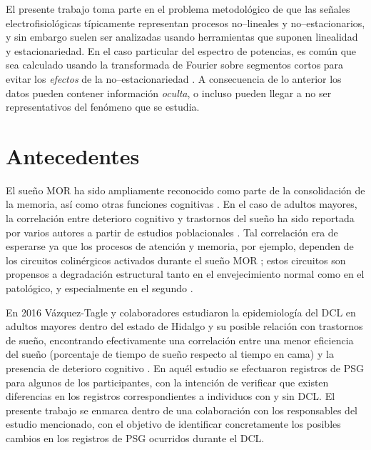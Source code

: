El presente trabajo toma parte en el problema metodológico de que las señales 
electrofisiológicas típicamente representan procesos no--lineales y no--estacionarios, y sin 
embargo suelen ser analizadas usando herramientas que suponen linealidad y estacionariedad.
%
En el caso particular del espectro de potencias, es común que sea calculado usando la 
transformada de Fourier sobre segmentos cortos para evitar los \textit{efectos} de la 
no--estacionariedad \cite{Kaiser00}.
%
A consecuencia de lo anterior los datos pueden contener información \textit{oculta}, o incluso 
pueden llegar a no ser representativos del fenómeno que se estudia. 
%


\section{Antecedentes}

El sueño MOR ha sido ampliamente reconocido como parte de la consolidación de la memoria, así como
otras funciones cognitivas 
\cite{Fishbein1971,Fishbein1977,Lucero1970,Pearlman1971,Pearlman1974,Smith1991}.
%
En el caso de adultos mayores, la correlación entre deterioro cognitivo y trastornos del sueño ha 
sido reportada por varios autores a partir de estudios poblacionales 
\cite{Amer13,Miyata13,Reid06,Potvin12}.
%
Tal correlación era de esperarse ya que los procesos de atención y memoria, por ejemplo, dependen de 
los circuitos colinérgicos activados durante el sueño MOR \cite{Braun1997}; estos circuitos son 
propensos a degradación estructural tanto en el envejecimiento normal como en el patológico,  y 
especialmente en el segundo \cite{Schliebs11}.

En 2016 Vázquez-Tagle y colaboradores estudiaron la epidemiología del DCL en adultos mayores dentro 
del estado de Hidalgo y su posible relación con trastornos de sueño, encontrando efectivamente una 
correlación entre una menor eficiencia del sueño (porcentaje de tiempo de sueño respecto al tiempo 
en cama) y la presencia de deterioro cognitivo \cite{VazquezTagle16}.
%
En aquél estudio se efectuaron registros de PSG para algunos de los participantes, con la intención 
de verificar que existen diferencias en los registros correspondientes a individuos con y sin DCL.
%
El presente trabajo se enmarca dentro de una colaboración con los responsables del estudio 
mencionado, con el objetivo de identificar concretamente los posibles cambios en los registros de PSG 
ocurridos durante el DCL.

